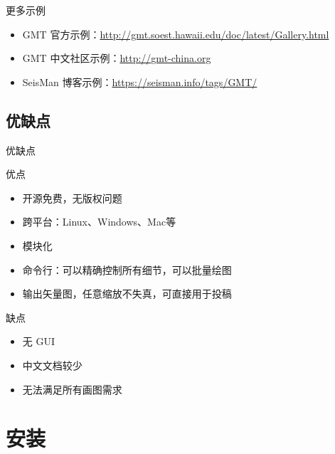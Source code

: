 \documentclass[UTF8, 11pt]{ctexbeamer}
\begin{document}
\begin{frame}{更多示例}
\begin{itemize}
\item GMT 官方示例：\url{http://gmt.soest.hawaii.edu/doc/latest/Gallery.html}
\item GMT 中文社区示例：\url{http://gmt-china.org}
\item SeisMan 博客示例：\url{https://seisman.info/tags/GMT/}
\end{itemize}
\end{frame}

\subsection{优缺点}
\begin{frame}{优缺点}
\begin{block}{优点}
\begin{itemize}
\item 开源免费，无版权问题
\item 跨平台：Linux、Windows、Mac等
\item 模块化
\item 命令行：可以精确控制所有细节，可以批量绘图
\item 输出矢量图，任意缩放不失真，可直接用于投稿
\end{itemize}
\end{block}
\pause
\begin{block}{缺点}
\begin{itemize}
\item 无 GUI
\item 中文文档较少
\item 无法满足所有画图需求
\end{itemize}
\end{block}
\end{frame}

\section{安装}
\end{document}
